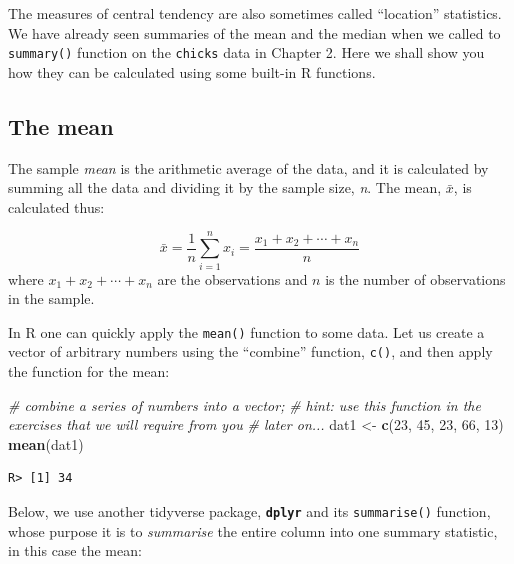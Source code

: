 \documentclass[english,10pt,a4paper,oneside]{book}
\newenvironment{Shaded}{\begin{snugshade}}{\end{snugshade}}
\newcommand{\CommentTok}[1]{\textcolor[rgb]{0.56,0.35,0.01}{\textit{#1}}}
\newcommand{\DataTypeTok}[1]{\textcolor[rgb]{0.13,0.29,0.53}{#1}}
\newcommand{\DecValTok}[1]{\textcolor[rgb]{0.00,0.00,0.81}{#1}}
\newcommand{\KeywordTok}[1]{\textcolor[rgb]{0.13,0.29,0.53}{\textbf{#1}}}
\newcommand{\NormalTok}[1]{#1}
\newcommand{\OperatorTok}[1]{\textcolor[rgb]{0.81,0.36,0.00}{\textbf{#1}}}
\newcommand{\StringTok}[1]{\textcolor[rgb]{0.31,0.60,0.02}{#1}}
\theoremstyle{definition}
\theoremstyle{definition}
\theoremstyle{definition}
\theoremstyle{remark}
\begin{document}
The measures of central tendency are also sometimes called
\enquote{location} statistics. We have already seen summaries of the
mean and the median when we called to \texttt{summary()} function on the
\texttt{chicks} data in Chapter 2. Here we shall show you how they can
be calculated using some built-in R functions.

\hypertarget{the-mean}{%
\subsection{The mean}\label{the-mean}}

The sample \emph{mean} is the arithmetic average of the data, and it is
calculated by summing all the data and dividing it by the sample size,
\emph{n}. The mean, \(\bar{x}\), is calculated thus:

\[\bar{x} = \frac{1}{n}\sum_{i=1}^{n}x_{i} = \frac{x_{1} + x_{2} + \cdots + x_{n}}{n}\]
where \(x_{1} + x_{2} + \cdots + x_{n}\) are the observations and \(n\)
is the number of observations in the sample.

In R one can quickly apply the \texttt{mean()} function to some data.
Let us create a vector of arbitrary numbers using the \enquote{combine}
function, \texttt{c()}, and then apply the function for the mean:

\begin{Shaded}
\begin{Highlighting}[]
\CommentTok{# combine a series of numbers into a vector;}
\CommentTok{# hint: use this function in the exercises that we will require from you}
\CommentTok{# later on...}
\NormalTok{dat1 <-}\StringTok{ }\KeywordTok{c}\NormalTok{(}\DecValTok{23}\NormalTok{, }\DecValTok{45}\NormalTok{, }\DecValTok{23}\NormalTok{, }\DecValTok{66}\NormalTok{, }\DecValTok{13}\NormalTok{)}
\KeywordTok{mean}\NormalTok{(dat1)}
\end{Highlighting}
\end{Shaded}

\begin{verbatim}
R> [1] 34
\end{verbatim}

Below, we use another tidyverse package, \textbf{\texttt{dplyr}} and its
\texttt{summarise()} function, whose purpose it is to \emph{summarise}
the entire column into one summary statistic, in this case the mean:

\begin{Shaded}
\end{Shaded}
\end{document}
